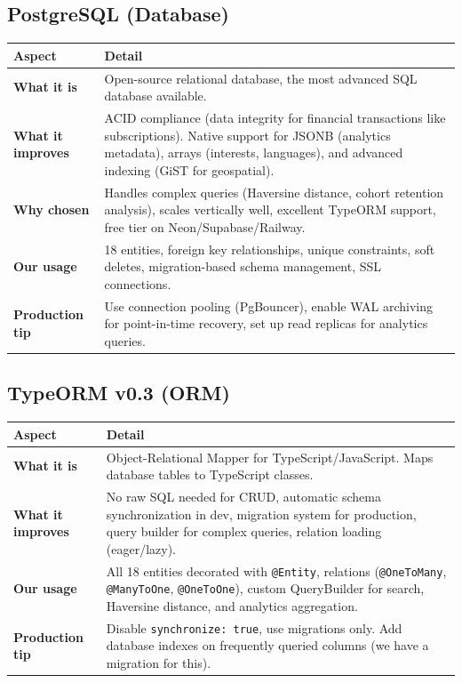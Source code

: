 \documentclass[a4paper,11pt]{article}
\begin{document}
\subsection{PostgreSQL (Database)}

\begin{longtable}{L{3.5cm} L{11.5cm}}
\toprule
\textbf{Aspect} & \textbf{Detail} \\
\midrule
\endhead
\textbf{What it is} & Open-source relational database, the most advanced SQL database available. \\
\midrule
\textbf{What it improves} & ACID compliance (data integrity for financial transactions like subscriptions). Native support for JSONB (analytics metadata), arrays (interests, languages), and advanced indexing (GiST for geospatial). \\
\midrule
\textbf{Why chosen} & Handles complex queries (Haversine distance, cohort retention analysis), scales vertically well, excellent TypeORM support, free tier on Neon/Supabase/Railway. \\
\midrule
\textbf{Our usage} & 18 entities, foreign key relationships, unique constraints, soft deletes, migration-based schema management, SSL connections. \\
\midrule
\textbf{Production tip} & Use connection pooling (PgBouncer), enable WAL archiving for point-in-time recovery, set up read replicas for analytics queries. \\
\bottomrule
\end{longtable}

\subsection{TypeORM v0.3 (ORM)}

\begin{longtable}{L{3.5cm} L{11.5cm}}
\toprule
\textbf{Aspect} & \textbf{Detail} \\
\midrule
\endhead
\textbf{What it is} & Object-Relational Mapper for TypeScript/JavaScript. Maps database tables to TypeScript classes. \\
\midrule
\textbf{What it improves} & No raw SQL needed for CRUD, automatic schema synchronization in dev, migration system for production, query builder for complex queries, relation loading (eager/lazy). \\
\midrule
\textbf{Our usage} & All 18 entities decorated with \texttt{@Entity}, relations (\texttt{@OneToMany}, \texttt{@ManyToOne}, \texttt{@OneToOne}), custom QueryBuilder for search, Haversine distance, and analytics aggregation. \\
\midrule
\textbf{Production tip} & Disable \texttt{synchronize: true}, use migrations only. Add database indexes on frequently queried columns (we have a migration for this). \\
\bottomrule
\end{longtable}
\end{document}
